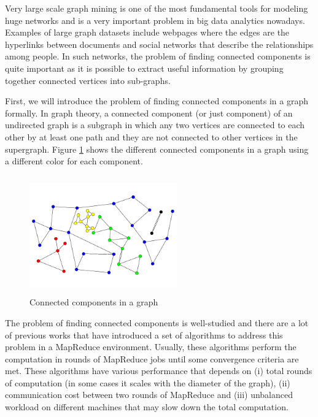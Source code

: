 Very large scale graph mining is one of the most fundamental tools for modeling huge networks and is a very important problem in big data analytics nowadays. Examples of large graph datasets include webpages where the edges are the hyperlinks between documents and social networks that describe the relationships among people. In such networks, the problem of finding connected components is quite important as it is possible to extract useful information by grouping together connected vertices into sub-graphs.

First, we will introduce the problem of finding connected components in a graph formally. In graph theory, a connected component (or just component) of an undirected graph is a subgraph in which any two vertices are connected to each other by at least one path and they are not connected to other vertices in the supergraph. Figure \ref{figure:connected} shows the different connected components in a graph using a different color for each component.

\begin{figure}[!h]
 \centering
    \includegraphics[height=12pc,width=15pc]{figures/connected_components.png}
	\caption{Connected components in a graph}
    \label{figure:connected}
\end{figure}

The problem of finding connected components is well-studied and there are a lot of previous works that have introduced a set of algorithms to address this problem in a MapReduce \cite{mapreduce} environment. Usually, these algorithms perform the computation in rounds of MapReduce jobs until some convergence criteria are met. These algorithms have various performance that depends on (i) total rounds of computation (in some cases it scales with the diameter of the graph), (ii) communication cost between two rounds of MapReduce and (iii) unbalanced workload on different machines that may slow down the total computation.

